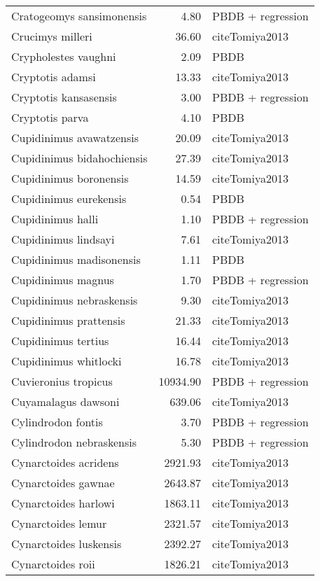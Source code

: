 \begin{table}[ht]
\begin{tabular}{lrl}
  Cratogeomys sansimonensis & 4.80 & PBDB + regression \\ 
  Crucimys milleri & 36.60 & cite{Tomiya2013} \\ 
  Crypholestes vaughni & 2.09 & PBDB \\ 
  Cryptotis adamsi & 13.33 & cite{Tomiya2013} \\ 
  Cryptotis kansasensis & 3.00 & PBDB + regression \\ 
  Cryptotis parva & 4.10 & PBDB \\ 
  Cupidinimus avawatzensis & 20.09 & cite{Tomiya2013} \\ 
  Cupidinimus bidahochiensis & 27.39 & cite{Tomiya2013} \\ 
  Cupidinimus boronensis & 14.59 & cite{Tomiya2013} \\ 
  Cupidinimus eurekensis & 0.54 & PBDB \\ 
  Cupidinimus halli & 1.10 & PBDB + regression \\ 
  Cupidinimus lindsayi & 7.61 & cite{Tomiya2013} \\ 
  Cupidinimus madisonensis & 1.11 & PBDB \\ 
  Cupidinimus magnus & 1.70 & PBDB + regression \\ 
  Cupidinimus nebraskensis & 9.30 & cite{Tomiya2013} \\ 
  Cupidinimus prattensis & 21.33 & cite{Tomiya2013} \\ 
  Cupidinimus tertius & 16.44 & cite{Tomiya2013} \\ 
  Cupidinimus whitlocki & 16.78 & cite{Tomiya2013} \\ 
  Cuvieronius tropicus & 10934.90 & PBDB + regression \\ 
  Cuyamalagus dawsoni & 639.06 & cite{Tomiya2013} \\ 
  Cylindrodon fontis & 3.70 & PBDB + regression \\ 
  Cylindrodon nebraskensis & 5.30 & PBDB + regression \\ 
  Cynarctoides acridens & 2921.93 & cite{Tomiya2013} \\ 
  Cynarctoides gawnae & 2643.87 & cite{Tomiya2013} \\ 
  Cynarctoides harlowi & 1863.11 & cite{Tomiya2013} \\ 
  Cynarctoides lemur & 2321.57 & cite{Tomiya2013} \\ 
  Cynarctoides luskensis & 2392.27 & cite{Tomiya2013} \\ 
  Cynarctoides roii & 1826.21 & cite{Tomiya2013} \\ 

\end{tabular}
\end{table}
